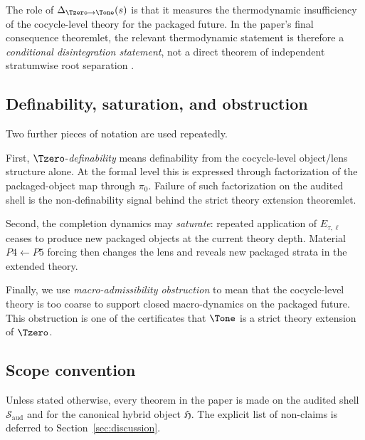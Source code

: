 The role of \(\Delta_{\Tzero\to \Tone}(s)\) is that it measures the thermodynamic insufficiency of the cocycle-level theory for the packaged future. In the paper’s final consequence theoremlet, the relevant thermodynamic statement is therefore a \emph{conditional disintegration statement}, not a direct theorem of independent stratumwise root separation \cite{Rokhlin1949FundamentalIdeas}.

\subsection{Definability, saturation, and obstruction}

Two further pieces of notation are used repeatedly.

First, \(\Tzero\)-\emph{definability} means definability from the cocycle-level object/lens structure alone. At the formal level this is expressed through factorization of the packaged-object map through \(\pi_0\). Failure of such factorization on the audited shell is the non-definability signal behind the strict theory extension theoremlet.

Second, the completion dynamics may \emph{saturate}: repeated application of \(E_{\tau,\ell}\) ceases to produce new packaged objects at the current theory depth. Material \(P4\leftarrow P5\) forcing then changes the lens and reveals new packaged strata in the extended theory.

Finally, we use \emph{macro-admissibility obstruction} to mean that the cocycle-level theory is too coarse to support closed macro-dynamics on the packaged future. This obstruction is one of the certificates that \(\Tone\) is a strict theory extension of \(\Tzero\).

\subsection{Scope convention}

Unless stated otherwise, every theorem in the paper is made on the audited shell \(\mathcal{S}_{\mathrm{aud}}\) and for the canonical hybrid object \(\mathfrak{H}\). The explicit list of non-claims is deferred to Section~\ref{sec:discussion}.

